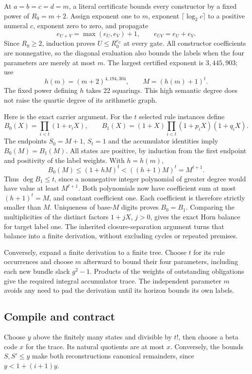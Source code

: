 At $a=b=c=d=m$, a literal certificate bounds every constructor by a fixed
power of $R_0=m+2$.  Assign exponent one to $m$, exponent
$\lceil\log_2 c\rceil$ to a positive numeral $c$, exponent zero to zero,
and propagate
\[
 e_{U+V}=\max(e_U,e_V)+1,\qquad e_{UV}=e_U+e_V.
\]
Since $R_0\ge2$, induction proves $U\le R_0^{e_U}$ at every gate.
All constructor coefficients are nonnegative, so the diagonal evaluation
also bounds the labels when the four parameters are merely at most $m$.
The largest certified exponent is $3,445,903$; use
\[
 h(m)=(m+2)^{4,194,304},\qquad M=(h(m)+1)^t.
\]
The fixed power defining $h$ takes 22 squarings.  This high semantic degree
does not raise the quartic degree of its arithmetic graph.

Here is the exact carrier argument.  For the $t$ selected rule instances
define
\[
 B_0(X)=\prod_{i<t}(1+v_iX),\qquad
 B_1(X)=(1+X)\prod_{i<t}(1+p_iX)(1+q_iX).
\]
The endpoints $S_0=M+1$, $S_t=1$ and the accumulator identities imply
$B_0(M)=B_1(M)$.  All states are positive, by induction from the first
endpoint and positivity of the label weights.  With $h=h(m)$,
\[
 B_0(M)\le(1+hM)^t<((h+1)M)^t=M^{t+1}.
\]
Thus $\deg B_1\le t$, since a nonnegative integer polynomial of greater
degree would have value at least $M^{t+1}$.  Both polynomials now have
coefficient sum at most $(h+1)^t=M$, and constant coefficient one.  Each
coefficient is therefore strictly smaller than $M$.  Uniqueness of
base-$M$ digits proves $B_0=B_1$.  Comparing the multiplicities of the
distinct factors $1+jX$, $j>0$, gives the exact Horn balance for target
label one.  The inherited closure-separation argument turns that balance
into a finite derivation, without excluding cycles or repeated premises.

Conversely, expand a finite derivation to a finite tree.  Choose $t$ for
its rule occurrences and choose $m$ afterward to bound their four
parameters, including each new bundle slack $g^2-1$.  Products of the
weights of outstanding obligations give the required integral
accumulator trace.  The independent parameter $m$ avoids any need to pad
the derivation until its horizon bounds its own labels.

\subsection{Compile and contract}

Choose $y$ above the finitely many states and divisible by $t!$, then
choose a beta code $x$ for the trace.  Its natural quotients are at most
$x$.  Conversely, the bounds $S,S'\le y$ make both reconstructions
canonical remainders, since $y<1+(i+1)y$.


